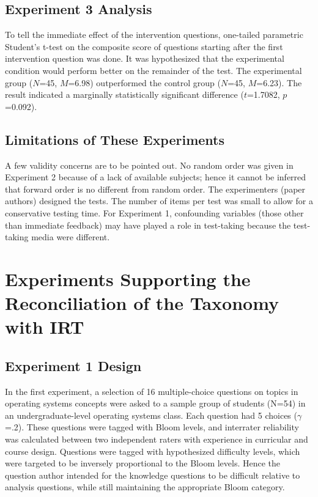 \subsection{Experiment 3 Analysis}

To tell the immediate effect of the intervention questions, one-tailed
parametric Student's t-test on the composite score of questions starting after
the first intervention question was done. It was hypothesized that the
experimental condition would perform better on the remainder of the test. The
experimental group ($N$=45, $M$=6.98) outperformed the control group ($N$=45,
$M$=6.23).  The result indicated a marginally statistically significant
difference ($t$=1.7082, $p$=0.092).

\subsection{Limitations of These Experiments}

A few validity concerns are to be pointed out. No random order was given in
Experiment 2 because of a lack of available subjects; hence it cannot be
inferred that forward order is no different from random order. The
experimenters (paper authors) designed the tests. The number of items per test
was small to allow for a conservative testing time.  For Experiment 1,
confounding variables (those other than immediate feedback) may have played a
role in test-taking because the test-taking media were different.


\section{Experiments Supporting the Reconciliation of the Taxonomy with IRT}

\subsection{Experiment 1 Design}

In the first experiment, a selection of 16 multiple-choice questions on topics
in operating systems concepts were asked to a sample group of students (N=54)
in an undergraduate-level operating systems class.  Each question had 5 choices
($\gamma$=.2). These questions were tagged with Bloom levels, and interrater
reliability was calculated between two independent raters with experience in
curricular and course design.  Questions were tagged with hypothesized
difficulty levels, which were targeted to be inversely proportional to the
Bloom levels.  Hence the question author intended for the knowledge questions
to be difficult relative to analysis questions, while still maintaining the
appropriate Bloom category.

